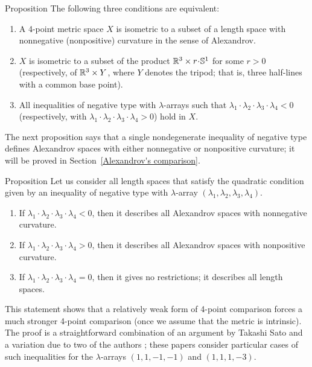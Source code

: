 \begin{thm}{Proposition}
The following three conditions are equivalent:
\begin{enumerate}
\item A 4-point metric space $X$ is isometric to a subset of a length space with nonnegative (nonpositive) curvature in the sense of Alexandrov.
\item $X$ is isometric to a subset of the product $\RR^3\times r\cdot \SSS^1$ for some $r>0$ (respectively, of $\mathbb{R}^3\times Y$, where $Y$ denotes the tripod; that is, three half-lines with a common base point).
\item All inequalities of negative type with $\lambda$-arrays such that $\lambda_1\cdot\lambda_2\cdot\lambda_3\cdot\lambda_4<0$ (respectively, with $\lambda_1\cdot\lambda_2\cdot\lambda_3\cdot\lambda_4>0$) hold in $X$.
\end{enumerate}
\end{thm}

The next proposition says that a single nondegenerate inequality of negative type defines Alexandrov spaces with either nonnegative or nonpositive curvature; it will be proved in Section~\ref{Alexandrov's comparison}.

\begin{thm}{Proposition}
Let us consider all length spaces that satisfy the quadratic condition given by an inequality of negative type with $\lambda$-array $(\lambda_1,\lambda_2,\lambda_3,\lambda_4)$.
\begin{enumerate}
\item If $\lambda_1\cdot\lambda_2\cdot\lambda_3\cdot\lambda_4<0$, then it describes all Alexandrov spaces with nonnegative curvature.
\item If $\lambda_1\cdot\lambda_2\cdot\lambda_3\cdot\lambda_4>0$, then it describes all Alexandrov spaces with nonpositive curvature.
\item If $\lambda_1\cdot\lambda_2\cdot\lambda_3\cdot\lambda_4=0$, then it gives no restrictions; it describes all length spaces.
\end{enumerate}

\end{thm}

This statement shows that a relatively weak form of 4-point comparison forces a much stronger 4-point comparison (once we assume that the metric is intrinsic).
The proof is a straightforward combination of an argument by Takashi Sato \cite{sato} and a variation due to two of the authors \cite{lebedeva-petrunin-2010};
these papers consider particular cases of such inequalities for the $\lambda$-arrays $(1,1,-1,-1)$ and $(1,1,1,-3)$.

